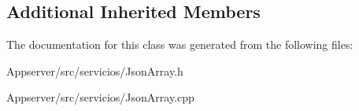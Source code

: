 \subsection*{Additional Inherited Members}


The documentation for this class was generated from the following files\+:\begin{DoxyCompactItemize}
\item 
Appserver/src/servicios/Json\+Array.\+h\item 
Appserver/src/servicios/Json\+Array.\+cpp\end{DoxyCompactItemize}
